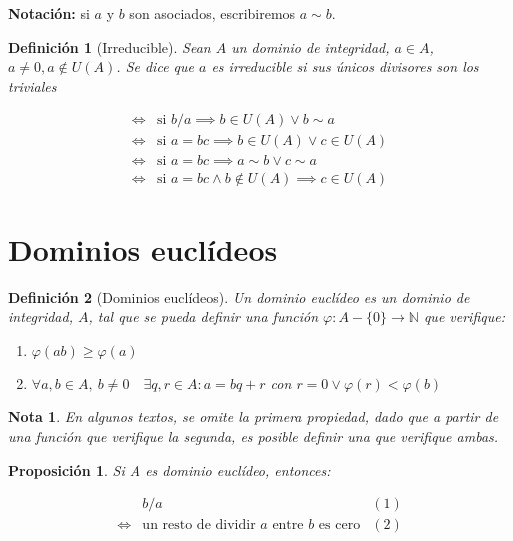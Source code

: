 \documentclass[11pt, a4paper, titlepage]{article}
\theoremstyle{theorem-style}
\newtheorem*{nprop}{Proposición}
\theoremstyle{definition-style}
\newtheorem*{ndef}{Definición}
\theoremstyle{remark-style}
\newtheorem*{nota}{Nota}
\theoremstyle{example-style}
\newenvironment{nlist}
{\begin{enumerate}
\renewcommand\labelenumi{(\emph{\roman{enumi})}}}
{\end{enumerate}}
\begin{document}
\textbf{Notación:} si $a$ y $b$ son asociados, escribiremos $a \sim b$.

\begin{ndef}[Irreducible]
	
	Sean $A$ un dominio de integridad, $a\in A$, $a\neq 0, a \notin U(A)$. Se dice que $a$ es irreducible si sus únicos divisores son los triviales

\begin{align*}
	\iff& \text{si } b/a \implies b\in U(A) \vee b \sim a
\\
	\iff& \text{si } a=bc \implies b\in U(A) \vee c \in U(A)
\\
	\iff& \text{si } a=bc \implies a\sim b \vee c \sim a
\\
	\iff& \text{si } a=bc \wedge b \notin U(A) \implies c \in U(A)
\end{align*}
\end{ndef}


\section{Dominios euclídeos}
\begin{ndef}[Dominios euclídeos]

	Un dominio euclídeo es un dominio de integridad, $A$, tal que se pueda definir una función $\varphi: A- \{0\} \to \mathbb{N} $ que verifique:

\begin{nlist}
	\item $\varphi(ab) \ge \varphi(a)$
	\item $\forall a,b \in A,\ b \neq 0 \quad \exists q,r \in A : a = bq + r $ con $r=0 \vee \varphi(r) < \varphi(b)$
\end{nlist}	
\end{ndef}

\begin{nota}
  En algunos textos, se omite la primera propiedad, dado que a partir de una función que verifique la segunda, es posible definir una que verifique ambas.
\end{nota}


\begin{nprop}
  Si A es dominio euclídeo, entonces:
 
  \[
  \begin{array}{lll}
    & b/a & (1) \\
    \iff & \text{un resto de dividir $a$ entre $b$ es cero} & (2) \\
  \end{array}
  \]
\end{nprop}
\end{document}
